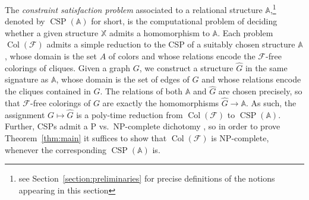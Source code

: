 \documentclass[oneside]{amsart}
\DeclareMathOperator{\col}{Col}
\newcommand{\str}[1]{\mathbb{#1}}
\newcommand{\cat}[1]{\mathcal{#1}}
\newcommand{\CSP}{\operatorname{CSP}}
\begin{document}
The \emph{constraint satisfaction problem} associated to a relational structure $\str A$,\footnote{see Section~\ref{section:preliminaries} for precise definitions of the notions appearing in this section}
denoted by $\CSP(\str A)$ for short, is the computational problem of deciding whether a given structure $\str X$ admits a homomorphism to $\str A$.  
Each problem $\col(\mathcal F)$ admits a simple reduction to the CSP of a suitably chosen structure $\str A$, whose domain is the set $A$ of colors and whose relations encode the $\cat F$-free colorings of cliques.
Given a graph $G$, we construct a structure $\hat G$ in the same signature as $\str A$, whose domain is the set of edges of $G$ and whose relations encode the cliques contained in $G$.
The relations of both $\str A$ and $\hat G$ are chosen precisely, so that $\cat F$-free colorings of $G$
are exactly the homomorphisms
$\hat G\to \str A$. 
As such, the assignment $G \mapsto \hat G$ is a poly-time reduction from $\col(\cat F)$ to $\CSP(\str A)$.
Further,
CSPs admit a P vs.\ NP-complete dichotomy
\cite{Bulatov,ZhukFOCS,ZhukACM}, so in order to prove Theorem~\ref{thm:main} it suffices to show that $\col(\cat F)$ is NP-complete, whenever the corresponding $\CSP(\str A)$ is.
\end{document}
